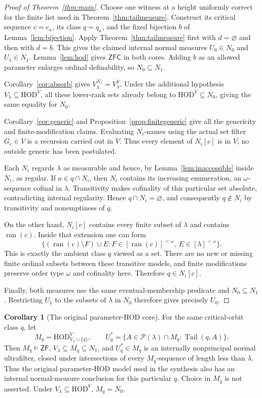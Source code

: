 \documentclass[11pt,letterpaper]{article}
\theoremstyle{definition}
\newtheorem{corollary}[definition]{Corollary}
\newcommand{\ZFC}{\mathsf{ZFC}}
\newcommand{\ZF}{\mathsf{ZF}}
\newcommand{\HOD}{\mathrm{HOD}}
\newcommand{\ran}{\operatorname{ran}}
\newcommand{\Pow}{\mathcal P}
\newcommand{\tail}{\operatorname{Tail}}
\begin{document}
\begin{proof}[Proof of Theorem~\ref{thm:main}]
Choose one witness at a height uniformly correct for the finite list used in Theorem~\ref{thm:tailmeasure}. Construct its critical sequence $c=c_\kappa$, its class $q=q_\kappa$, and the fixed bijection $b$ of Lemma~\ref{lem:bijection}. Apply Theorem~\ref{thm:tailmeasure} first with $d=\varnothing$ and then with $d=b$. This gives the claimed internal normal measures $U_0\in N_0$ and $U_1\in N_1$. Lemma~\ref{lem:hod} gives $\ZFC$ in both cores. Adding $b$ as an allowed parameter enlarges ordinal definability, so $N_0\subseteq N_1$.

Corollary~\ref{cor:absorb} gives $V_\lambda^{N_1}=V_\lambda^V$. Under the additional hypothesis $V_\lambda\subseteq\HOD^V$, all these lower-rank sets already belong to $\HOD^V\subseteq N_0$, giving the same equality for $N_0$.

Corollary~\ref{cor:generic} and Proposition~\ref{prop:finitegeneric} give all the genericity and finite-modification claims. Evaluating $N_i$-names using the actual set filter $G_c\in V$ is a recursion carried out in $V$. Thus every element of $N_i[c]$ is in $V$; no outside generic has been postulated.

Each $N_i$ regards $\lambda$ as measurable and hence, by Lemma~\ref{lem:inaccessible} inside $N_i$, as regular. If $a\in q\cap N_i$, then $N_i$ contains its increasing enumeration, an $\omega$-sequence cofinal in $\lambda$. Transitivity makes cofinality of this particular set absolute, contradicting internal regularity. Hence $q\cap N_i=\varnothing$, and consequently $q\notin N_i$ by transitivity and nonemptiness of $q$.

On the other hand, $N_i[c]$ contains every finite subset of $\lambda$ and contains $\ran(c)$. Inside that extension one can form
\[
 \{(\ran(c)\setminus F)\cup E:
          F\in[\ran(c)]^{<\omega},\ E\in[\lambda]^{<\omega}\}.
\]
This is exactly the ambient class $q$ viewed as a set. There are no new or missing finite ordinal subsets between these transitive models, and finite modifications preserve order type $\omega$ and cofinality here. Therefore $q\in N_i[c]$.

Finally, both measures use the same eventual-membership predicate and $N_0\subseteq N_1$. Restricting $U_1$ to the subsets of $\lambda$ in $N_0$ therefore gives precisely $U_0$.
\end{proof}

\begin{corollary}[The original parameter-HOD core]\label{cor:originalcore}
For the same critical-orbit class $q$, let
\[
 M_q=\HOD_{V_\lambda\cup\{q\}}^V,\qquad
 U_q^*=\{A\in\Pow(\lambda)\cap M_q:\tail(q,A)\}.
\]
Then $M_q\models\ZF$, $V_\lambda\subseteq M_q\subseteq N_1$, and $U_q^*\in M_q$ is an internally nonprincipal normal ultrafilter, closed under intersections of every $M_q$-sequence of length less than $\lambda$. Thus the original parameter-HOD model used in the synthesis also has an internal normal-measure conclusion for this particular $q$. Choice in $M_q$ is not asserted. Under $V_\lambda\subseteq\HOD^V$, $M_q=N_0$.
\end{corollary}
\end{document}
